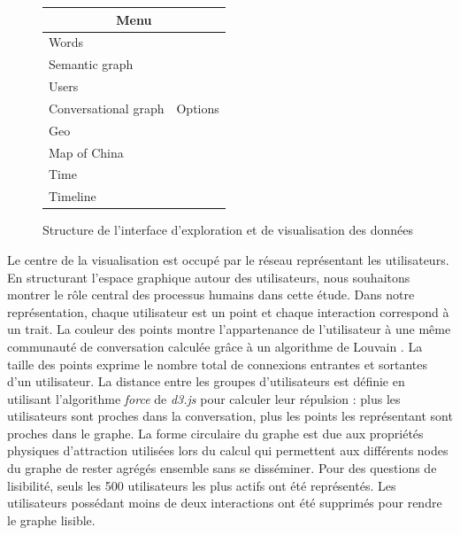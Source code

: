     \begin{figure}[htbp]
        \label{fig:schema-viz}
        \centering

        \begin{tabular}{ | p{5cm} | p{2cm} | }
            \hline
            \multicolumn{2}{|c|}{Menu} \\[.3cm] 
            \hline
            Words  &         \\
            Semantic graph &  \\[.5cm] \cline{1-1}
            Users &  \\
            Conversational graph & Options\\[.5cm] \cline{1-1}
            Geo &  \\
            Map of China &  \\[.5cm] \cline{1-1}
            Time   & \\
            Timeline &  \\[.5cm]
            \hline 
        \end{tabular}
        \caption{Structure de l'interface d'exploration et de visualisation des données}
    \end{figure}


    Le centre de la visualisation est occupé par le réseau représentant les utilisateurs. En structurant l'espace graphique autour des  utilisateurs, nous souhaitons montrer le r\^ole central des processus humains dans cette étude. Dans notre représentation, chaque utilisateur est un point et chaque interaction correspond à un trait. La couleur des points montre l{\textquoteright}appartenance de l{\textquoteright}utilisateur à une m\^eme communauté de conversation calculée gr\^ace à un algorithme de Louvain \citep{Blondel2008}. La taille des points exprime le nombre total de connexions entrantes et sortantes d{\textquoteright}un utilisateur. La distance entre les groupes d{\textquoteright}utilisateurs est définie en utilisant l{\textquoteright}algorithme \textit{force} de \textit{d3.js} \citep{Bostock2011} pour calculer leur répulsion : plus les utilisateurs sont proches dans la conversation, plus les points les représentant sont proches dans le graphe. La forme circulaire du graphe est due aux propriétés physiques d{\textquoteright}attraction utilisées lors du calcul qui permettent aux différents nodes du graphe de rester agrégés ensemble sans se disséminer. Pour des questions de lisibilité, seuls les 500 utilisateurs les plus actifs ont été représentés. Les utilisateurs possédant moins de deux interactions ont été supprimés pour rendre le graphe lisible. 
    
